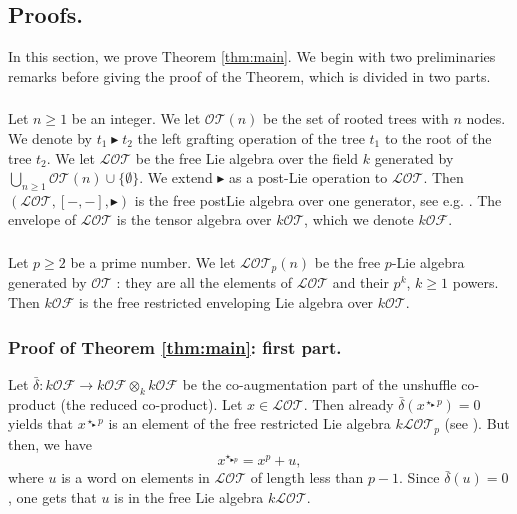 \documentclass[12pt]{article}
\newcommand{\btr}{\blacktriangleright}
\begin{document}
\subsection{Proofs.}
\label{sec:proofs} In this section, we prove Theorem \ref{thm:main}. We begin with two preliminaries remarks before giving the proof of the Theorem, which is divided in two parts.
\subsubsection{}
Let $n\geq 1$ be an integer. We let $\mathcal{O}\mathcal{T}(n)$ be the set of rooted trees with $n$ nodes. We denote by $t_1 \btr t_2 $ the left grafting operation of the tree $t_1$ to the root of the tree $t_2$. We let $\mathcal{L}\mathcal{O}\mathcal{T}$ be the free Lie algebra over the field $k$ generated by $\bigcup_{n\geq 1}\mathcal{O}\mathcal{T}(n) \cup \{ \emptyset \}$. We extend $\btr$ as a post-Lie operation to $\mathcal{L}\mathcal{O}\mathcal{T}$. Then $(\mathcal{L}\mathcal{O}\mathcal{T}, [-,-], \btr)$ is the free postLie algebra over one generator, see e.g. \cite{MKL}. The envelope of $\mathcal{L}\mathcal{O}\mathcal{T}$ is the tensor algebra over $k\mathcal{O}\mathcal{T}$, which we denote $k\mathcal{O}\mathcal{F}$.

\subsubsection{}
Let $p\geq 2$ be a prime number. We let $\mathcal{L}\mathcal{O}\mathcal{T}_p(n)$ be the free $p$-Lie algebra generated by $\mathcal{O}\mathcal{T}$ : they are all the elements of $\mathcal{L}\mathcal{O}\mathcal{T}$ and their $p^k$, $k\geq 1$ powers. Then $k\mathcal{O}\mathcal{F}$ is the free restricted enveloping Lie algebra over $k\mathcal{O}\mathcal{T}$.

\subsubsection{Proof of Theorem \ref{thm:main}: first part.}




Let $\bar{\delta} \colon k\mathcal{O}\mathcal{F} \rightarrow k\mathcal{O}\mathcal{F} \otimes_{k} k\mathcal{O}\mathcal{F}$ be the co-augmentation part of the unshuffle co-product (the reduced co-product). Let $x\in \mathcal{L}\mathcal{O}\mathcal{T}$. Then already
$
\bar{\delta}(x^{\star_{\btr}p}) = 0
$
yields that $x^{\star_{\btr} p}$ is an element of the free restricted Lie algebra $k\mathcal{L}\mathcal{O}\mathcal{T}_{p}$ (see \cite{Re}). But then, we have
$$
x^{\star_{\btr p}} = x^{p} + u,
$$
where $u$ is a word on elements in $\mathcal{L}\mathcal{O}\mathcal{T}$ of length less than $p-1$. Since $\bar{\delta}(u)=0$, one gets that $u$ is in the free Lie algebra $k\mathcal{L}\mathcal{O}\mathcal{T}$.
\end{document}
